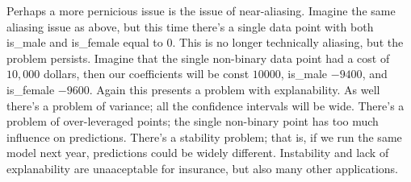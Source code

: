 \documentclass{amsbook}
\begin{document}
Perhaps a more pernicious issue is the issue of near-aliasing.  Imagine the same aliasing issue as above, but this time there's a single data point with both is\_male and is\_female equal to $0$.  This is no longer technically aliasing, but the problem persists.  Imagine that the single non-binary data point had a cost of $10,000$ dollars, then our coefficients will be const $10000$, is\_male $-9400$, and is\_female $-9600$.  Again this presents a problem with explanability.  As well there's a problem of variance; all the confidence intervals will be wide.  There's a problem of over-leveraged points; the single non-binary point has too much influence on predictions.  There's a stability problem; that is, if we run the same model next year, predictions could be widely different.  Instability and lack of explanability are unaaceptable for insurance, but also many other applications.
\end{document}
